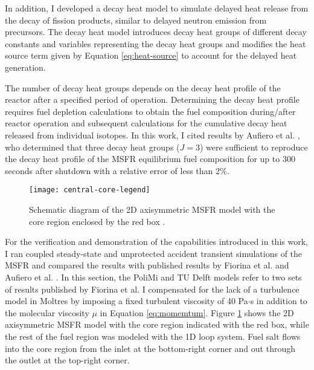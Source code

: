 In addition, I developed a decay heat model to simulate delayed heat release
from the decay of fission products, similar to delayed neutron emission
from precursors. The decay heat model introduces decay heat groups of different
decay constants and variables representing the decay heat groups and modifies the
heat source term given by Equation \ref{eq:heat-source} to account for
the delayed heat generation. 

The number of decay heat groups depends on
the decay heat profile of the reactor after a specified period of operation.
Determining the decay heat profile requires fuel depletion calculations to
obtain the fuel composition during/after reactor operation and subsequent
calculations for the cumulative decay heat released from individual isotopes.
In this work, I cited results by Aufiero et al. \cite{aufiero_extended_2013},
who determined that three decay heat groups ($J=3$) were sufficient to
reproduce the decay heat profile of the \gls{MSFR} equilibrium fuel composition
for up to 300 seconds after shutdown with a relative error of less than 2\%.

\begin{figure}[htb!]
	\centering
	\texttt{[image: central-core-legend]}
	\caption{Schematic diagram of the 2D axisymmetric \gls{MSFR} model with
	the core region enclosed by the red box \cite{park_advancement_2020}.}
	\label{fig:msfr-geometry}
\end{figure}

For the verification and demonstration of the capabilities introduced in this
work, I ran coupled steady-state and unprotected accident transient
simulations of the \gls{MSFR} and compared the results with published results
by Fiorina et al. \cite{fiorina_modelling_2014} and Aufiero et al.
\cite{aufiero_development_2014}. In this section, the PoliMi and TU Delft models
refer to two sets of results published by Fiorina et al. I compensated for
the lack of a turbulence model in Moltres by imposing a fixed turbulent
viscosity of 40 Pa$\cdot$s in addition to the molecular viscosity $\mu$ in
Equation \ref{eq:momemtum}. Figure \ref{fig:msfr-geometry} shows the 2D
axisymmetric \gls{MSFR} model with the core region indicated with the red box,
while the rest of the fuel region was modeled with the 1D loop system. Fuel
salt flows into the core region from the inlet at the bottom-right corner and
out through the outlet at the top-right corner.

